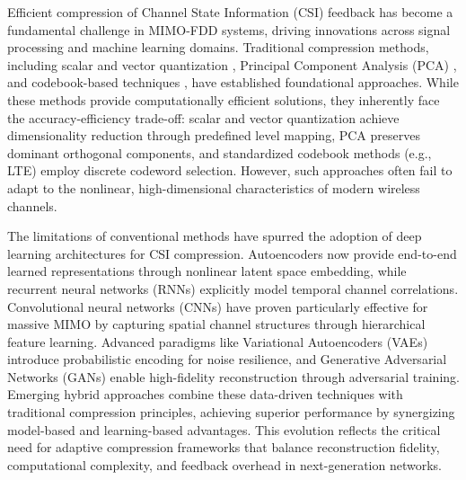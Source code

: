 \documentclass[lettersize,journal]{IEEEtran}
\begin{document}
Efficient compression of Channel State Information (CSI) feedback has become a fundamental challenge in MIMO-FDD systems, driving innovations across signal processing and machine learning domains. Traditional compression methods, including scalar and vector quantization \cite{vectorquantiz}, Principal Component Analysis (PCA) \cite{pca}, and codebook-based techniques \cite{compressivesensing}, have established foundational approaches. While these methods provide computationally efficient solutions, they inherently face the accuracy-efficiency trade-off: scalar and vector quantization achieve dimensionality reduction through predefined level mapping, PCA preserves dominant orthogonal components, and standardized codebook methods (e.g., LTE) employ discrete codeword selection. However, such approaches often fail to adapt to the nonlinear, high-dimensional characteristics of modern wireless channels.

The limitations of conventional methods have spurred the adoption of deep learning architectures for CSI compression. Autoencoders now provide end-to-end learned representations through nonlinear latent space embedding, while recurrent neural networks (RNNs) explicitly model temporal channel correlations. Convolutional neural networks (CNNs) have proven particularly effective for massive MIMO by capturing spatial channel structures through hierarchical feature learning. Advanced paradigms like Variational Autoencoders (VAEs) introduce probabilistic encoding for noise resilience, and Generative Adversarial Networks (GANs) enable high-fidelity reconstruction through adversarial training. Emerging hybrid approaches combine these data-driven techniques with traditional compression principles, achieving superior performance by synergizing model-based and learning-based advantages. This evolution reflects the critical need for adaptive compression frameworks that balance reconstruction fidelity, computational complexity, and feedback overhead in next-generation networks.
\end{document}
